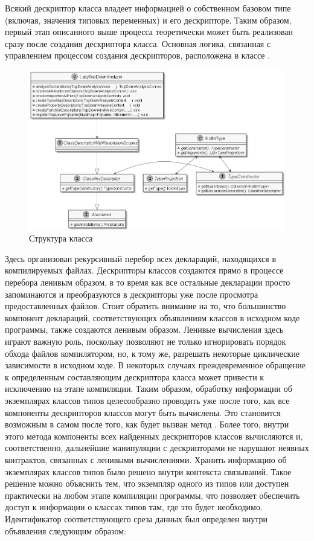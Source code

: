 Всякий дескриптор класса владеет информацией о собственном базовом типе (включая, значения типовых переменных) и его дескрипторе. Таким образом, первый этап описанного выше процесса теоретически может быть реализован сразу после создания дескриптора класса. Основная логика, связанная с управлением процессом создания дескрипторов, расположена в классе . 

\begin{figure}[htbp]
    \centering
    \includegraphics[width=\textwidth]{resources/06/12_class_descriptor.png}
    \caption{Структура класса }
    \label{fig:lazy-top-down-analyzer}
\end{figure}

Здесь организован рекурсивный перебор всех деклараций, находящихся в компилируемых файлах. Дескрипторы классов создаются прямо в процессе перебора ленивым образом, в то время как все остальные декларации просто запоминаются и преобразуются в дескрипторы уже после просмотра предоставленных файлов. Стоит обратить внимание на то, что большинство компонент деклараций, соответствующих объявлениям классов в исходном коде программы, также создаются ленивым образом. Ленивые вычисления здесь играют важную роль, поскольку позволяют не только игнорировать порядок обхода файлов компилятором, но, к тому же, разрешать некоторые циклические зависимости в исходном коде. В некоторых случаях преждевременное обращение к определенным составляющим дескриптора класса может привести к исключению на этапе компиляции. Таким образом, обработку информации об экземплярах классов типов целесообразно проводить уже после того, как все компоненты дескрипторов классов могут быть вычислены. Это становится возможным в самом  после того, как будет вызван метод . Более того, внутри этого метода компоненты всех найденных дескрипторов классов вычисляются и, соответственно, дальнейшие манипуляции с дескрипторами не нарушают неявных контрактов, связанных с ленивыми вычислениями. Хранить информацию об экземплярах классов типов было решено внутри контекста связываний. Такое решение можно объяснить тем, что экземпляр одного из типов  или  доступен практически на любом этапе компиляции программы, что позволяет обеспечить доступ к информации о классах типов там, где это будет необходимо. Идентификатор соответствующего среза данных был определен внутри объявления  следующим образом:

